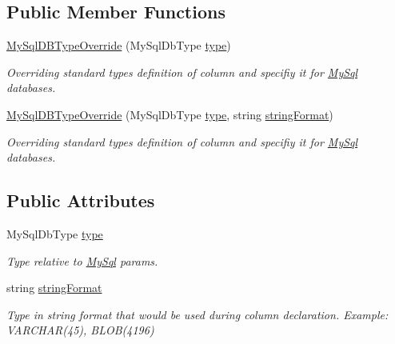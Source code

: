 \subsection*{Public Member Functions}
\begin{DoxyCompactItemize}
\item 
\mbox{\hyperlink{class_uniform_data_operator_1_1_sql_1_1_my_sql_1_1_attributes_1_1_my_sql_d_b_type_override_aa560e25692613f1a6860f8991dc18a66}{My\+Sql\+D\+B\+Type\+Override}} (My\+Sql\+Db\+Type \mbox{\hyperlink{class_uniform_data_operator_1_1_sql_1_1_my_sql_1_1_attributes_1_1_my_sql_d_b_type_override_a6521991385a038d7f5878ab6bbcb5795}{type}})
\begin{DoxyCompactList}\small\item\em Overriding standard type\textquotesingle{}s definition of column and specifiy it for \mbox{\hyperlink{namespace_uniform_data_operator_1_1_sql_1_1_my_sql}{My\+Sql}} databases. \end{DoxyCompactList}\item 
\mbox{\hyperlink{class_uniform_data_operator_1_1_sql_1_1_my_sql_1_1_attributes_1_1_my_sql_d_b_type_override_acd28e7a908283c3cb18a0c83e701b85e}{My\+Sql\+D\+B\+Type\+Override}} (My\+Sql\+Db\+Type \mbox{\hyperlink{class_uniform_data_operator_1_1_sql_1_1_my_sql_1_1_attributes_1_1_my_sql_d_b_type_override_a6521991385a038d7f5878ab6bbcb5795}{type}}, string \mbox{\hyperlink{class_uniform_data_operator_1_1_sql_1_1_my_sql_1_1_attributes_1_1_my_sql_d_b_type_override_a708ba68a2b1ab31ed51c196bb3e4574f}{string\+Format}})
\begin{DoxyCompactList}\small\item\em Overriding standard type\textquotesingle{}s definition of column and specifiy it for \mbox{\hyperlink{namespace_uniform_data_operator_1_1_sql_1_1_my_sql}{My\+Sql}} databases. \end{DoxyCompactList}\end{DoxyCompactItemize}
\subsection*{Public Attributes}
\begin{DoxyCompactItemize}
\item 
My\+Sql\+Db\+Type \mbox{\hyperlink{class_uniform_data_operator_1_1_sql_1_1_my_sql_1_1_attributes_1_1_my_sql_d_b_type_override_a6521991385a038d7f5878ab6bbcb5795}{type}}
\begin{DoxyCompactList}\small\item\em Type relative to \mbox{\hyperlink{namespace_uniform_data_operator_1_1_sql_1_1_my_sql}{My\+Sql}} params. \end{DoxyCompactList}\item 
string \mbox{\hyperlink{class_uniform_data_operator_1_1_sql_1_1_my_sql_1_1_attributes_1_1_my_sql_d_b_type_override_a708ba68a2b1ab31ed51c196bb3e4574f}{string\+Format}}
\begin{DoxyCompactList}\small\item\em Type in string format that would be used during column declaration. Example\+: V\+A\+R\+C\+H\+A\+R(45), B\+L\+O\+B(4196) \end{DoxyCompactList}\end{DoxyCompactItemize}


